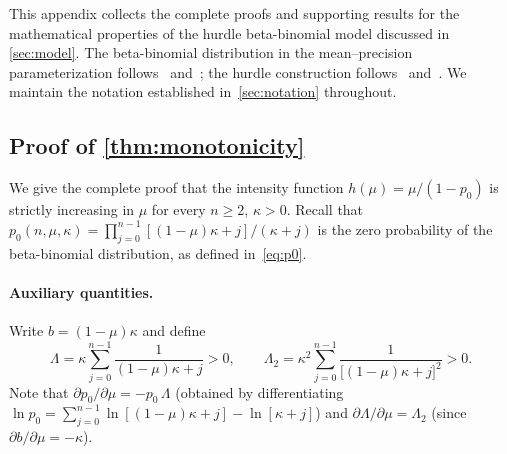 
This appendix collects the complete proofs and supporting results for the
mathematical properties of the hurdle beta-binomial model discussed in
\cref{sec:model}. The beta-binomial distribution in the mean--precision
parameterization follows~\citet{Griffiths1973} and~\citet{Prentice1986};
the hurdle construction follows~\citet{Mullahy1986} and~\citet{Cragg1971}.
We maintain the notation established in~\cref{sec:notation}
throughout.


\subsection{Proof of \texorpdfstring{\cref{thm:monotonicity}}{Theorem~2.1}}
\label{sma:proof-monotonicity}

We give the complete proof that the intensity function
$h(\mu) = \mu / (1 - p_0)$ is strictly increasing in $\mu$ for every
$n \ge 2$, $\kappa > 0$. Recall that
$p_0(n,\mu,\kappa) = \prod_{j=0}^{n-1}[(1-\mu)\kappa + j]/(\kappa + j)$
is the zero probability of the beta-binomial distribution, as defined
in~\eqref{eq:p0}.

\paragraph{Auxiliary quantities.}
Write $b = (1-\mu)\kappa$ and define
\begin{equation}\label{sma:eq-Lambda}
  \Lambda
  = \kappa \sum_{j=0}^{n-1} \frac{1}{(1-\mu)\kappa + j}
  > 0,
  \qquad
  \Lambda_2
  = \kappa^2 \sum_{j=0}^{n-1} \frac{1}{\bigl[(1-\mu)\kappa + j\bigr]^2}
  > 0.
\end{equation}
Note that $\partial p_0/\partial\mu = -p_0\,\Lambda$ (obtained by
differentiating $\ln p_0 = \sum_{j=0}^{n-1}\ln[(1-\mu)\kappa + j]
- \ln[\kappa + j]$) and $\partial\Lambda/\partial\mu = \Lambda_2$
(since $\partial b/\partial\mu = -\kappa$).

